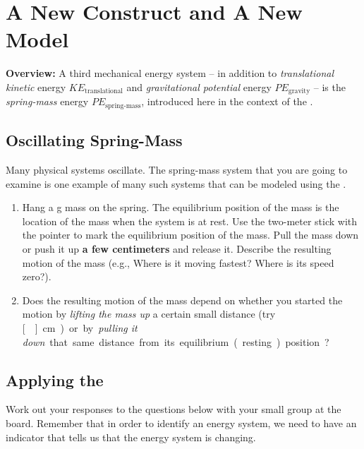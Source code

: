 \section{A New Construct and A New Model}
\label{act2.1.2}

\begin{overview}
\textbf{Overview:} A third mechanical energy system -- in addition to \emph{translational kinetic} energy $KE_\text{translational}$ and \emph{gravitational potential} energy $PE_\text{gravity}$ -- is the \emph{spring-mass} energy $PE_\text{spring-mass}$, introduced here in the context of the \SOModel{}.
\end{overview}

\subsection{Oscillating Spring-Mass}

Many physical systems oscillate. The spring-mass system that you are going to examine is one example of many such systems that can be modeled using the \SOModel{}.

\begin{enumerate}
	\item Hang a \unit[200]{g} mass on the spring. The equilibrium position of the mass is the location of the mass when the system is at rest. Use the two-meter stick with the pointer to mark the equilibrium position of the mass. Pull the mass down or push it up \textbf{a few centimeters} and release it. Describe the resulting motion of the mass (e.g., Where is it moving fastest? Where is its speed zero?).
	
	\item Does the resulting motion of the mass depend on whether you started the motion by \emph{lifting the mass up} a certain small distance (try \unit[]{cm}) or by \emph{pulling it down} that same distance from its equilibrium (resting) position?
\end{enumerate}

\WCD

\subsection{Applying the \EnergyInteractionModel{}}
\label{act212.2}

\noindent Work out your responses to the questions below with your small group at the board. Remember that in order to identify an energy system, we need to have an indicator that tells us that the energy system is changing.\\


